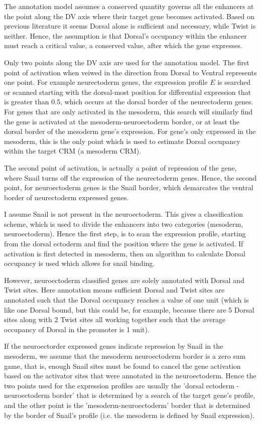 The annotation model assumes a conserved quantity governs all the enhancers at the point along the DV axis where their target gene becomes activated.  Based on previous literature it seems Dorsal alone is sufficient and necessary, while Twist is neither.  Hence, the assumption is that Dorsal's occupancy within the enhancer must reach a critical value, a conserved value, after which the gene expresses.  

Only two points along the DV axis are used for the annotation model.  The first point of activation when veiwed in the direction from Dorsal to Ventral represents one point.  For example neurectoderm genes, the expression profile $E$ is searched or scanned starting with the dorsal-most position for differential expression that is greater than 0.5, which occurs at the dorsal border of the neurectoderm genes.  For genes that are only activated in the mesoderm, this search will similarly find the gene is activated at the mesoderm-neuroectoderm border, or at least the dorsal border of the mesoderm gene's expression.  For gene's only expressed in the mesoderm, this is the only point which is used to estimate Dorsal occupancy within the target CRM (a mesoderm CRM).  

The second point of activation, is actually a point of repression of the gene, where Snail turns off the expression of the neurectoderm genes.  Hence, the second point, for neuroectoderm genes is the Snail border, which demarcates the ventral border of neurectoderm expressed genes. 

I assume Snail is not present in the neuroectoderm.  This gives a classification scheme, which is used to divide the enhancers into two categories (mesoderm, neuroectoderm).  Hence the first step, is to scan the expression profile, starting from the dorsal ectoderm and find the position where the gene is activated.  If activation is first detected in mesoderm, then an algorithm to calculate Dorsal occupancy is used which allows for snail binding.

  However, neuroectoderm classified genes are solely annotated with Dorsal and Twist sites.  Here annotation means sufficient Dorsal and Twist sites are annotated such that the Dorsal occupancy reaches a value of one unit (which is like one Dorsal bound, but this could be, for example, because there are 5 Dorsal sites along with 2 Twist sites all working together such that the average occupancy of Dorsal in the promoter is 1 unit).  
  
  If the neuroectorder expressed genes indicate repression by Snail in the mesoderm, we assume that the mesoderm neuroectoderm border is a zero sum game, that is, enough Snail sites must be found to cancel the gene activation based on the activator sites that were annotated in the neuroectoderm.  Hence the two points used for the expression profiles are usually the 'dorsal ectoderm - neuroectoderm border' that is determined by a search of the target gene's profile, and the other point is the 'mesoderm-neuroectoderm' border that is determined by the border of Snail's profile (i.e. the mesoderm is defined by Snail expression).
  
